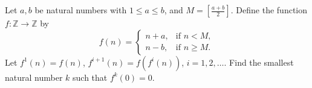 Let $a, b$ be natural numbers with $1 \leq a \leq b$, and $M = \left[\frac{a+b}{2}\right]$. Define the function $f : \mathbb{Z} \to \mathbb{Z}$ by
\[ f(n) = \begin{cases} n+a, & \text{if } n < M, \\ n-b, & \text{if } n \geq M. \end{cases} \]
Let $f^1(n) = f(n)$, $f^{i+1}(n) = f(f^i(n))$, $i = 1, 2, \ldots$. Find the smallest natural number $k$ such that $f^k(0) = 0$.
